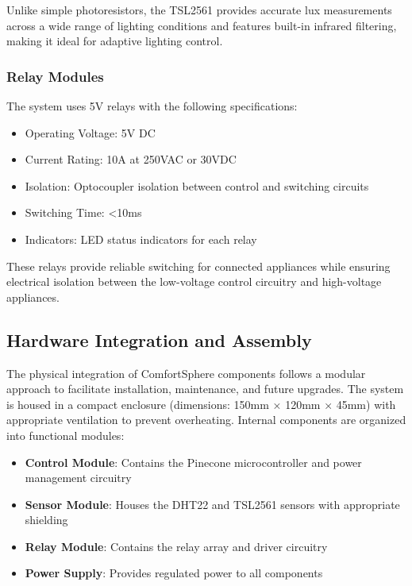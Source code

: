 \documentclass[a4paper]{scrartcl}
\begin{document}
    Unlike simple photoresistors, the TSL2561 provides accurate lux measurements across a wide range of lighting conditions and features built-in infrared filtering, making it ideal for adaptive lighting control.
    
    \subsubsection{Relay Modules}
    The system uses 5V relays with the following specifications:
    \begin{itemize}
        \item Operating Voltage: 5V DC
        \item Current Rating: 10A at 250VAC or 30VDC
        \item Isolation: Optocoupler isolation between control and switching circuits
        \item Switching Time: <10ms
        \item Indicators: LED status indicators for each relay
    \end{itemize}
    
    These relays provide reliable switching for connected appliances while ensuring electrical isolation between the low-voltage control circuitry and high-voltage appliances.
    
    \subsection{Hardware Integration and Assembly}
    The physical integration of ComfortSphere components follows a modular approach to facilitate installation, maintenance, and future upgrades. The system is housed in a compact enclosure (dimensions: 150mm × 120mm × 45mm) with appropriate ventilation to prevent overheating. Internal components are organized into functional modules:
    
    \begin{itemize}
        \item \textbf{Control Module}: Contains the Pinecone microcontroller and power management circuitry
        \item \textbf{Sensor Module}: Houses the DHT22 and TSL2561 sensors with appropriate shielding
        \item \textbf{Relay Module}: Contains the relay array and driver circuitry
        \item \textbf{Power Supply}: Provides regulated power to all components
    \end{itemize}
    
\end{document}
